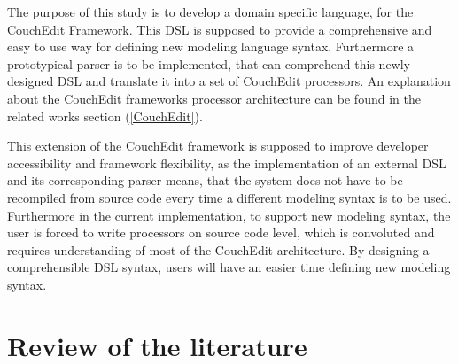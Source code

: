 \documentclass[10pt,a4paper,oneside]{scrartcl}
\newcommand\hint[2]{
\ifthenelse{\boolean{showhints}}{
\begin{center}
\colorbox{black!10}{
\begin{minipage}{.963\textwidth}
#2\hfill\textbf{#1}
\end{minipage}
}\end{center}}{}
}
\begin{document}
The purpose of this study is to develop a domain specific language, for the CouchEdit Framework. This DSL is supposed to provide a comprehensive and easy to use way for defining new modeling language syntax. Furthermore a prototypical parser is to be implemented, that can comprehend this newly designed DSL and translate it into a set of CouchEdit processors. An explanation about the CouchEdit frameworks processor architecture can be found in the related works section (\ref{CouchEdit}).

This extension of the CouchEdit framework is supposed to improve developer accessibility and framework flexibility, as the implementation of an external DSL and its corresponding parser means, that the system does not have to be recompiled from source code every time a different modeling syntax is to be used. Furthermore in the current implementation, to support new modeling syntax, the user is forced to write processors on source code level, which is convoluted and requires understanding of most of the CouchEdit architecture. By designing a comprehensible DSL syntax, users will have an easier time defining new modeling syntax. 



\section{Review of the literature}

		
\end{document}
